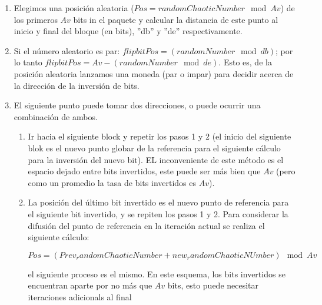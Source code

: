 \begin{enumerate}
\item Elegimos una posición aleatoria ($Pos = randomChaoticNumber \mod{Av}$) de los primeros $Av$ bits in el paquete y calcular la distancia de este punto al inicio y final del bloque (en bits), ''db'' y ''de'' respectivamente.

\item Si el número aleatorio es par: $flipbitPos = (randomNumber \mod{db})$; por lo tanto $flipbitPos = Av - (randomNumber \mod{de})$. Esto es, de la posición aleatoria lanzamos una moneda (par o impar) para decidir acerca de la dirección de la inversión de bits.


\item El siguiente punto puede tomar dos direcciones, o puede ocurrir una combinación de ambos.

\begin{enumerate}
\item Ir hacia el siguiente block y repetir los pasos 1 y 2 (el inicio del siguiente blok es el nuevo punto globar de la referencia para el siguiente cálculo para la inversión del nuevo bit). EL inconveniente de este método es el espacio dejado entre bits invertidos, este puede ser más bien que $Av$ (pero como un promedio la tasa de bits invertidos es $Av$).




\item La posición del último bit invertido es el nuevo punto de referencia para el siguiente bit invertido, y se repiten los pasos 1 y 2. Para considerar la difusión del punto de referencia en la iteración actual se realiza el siguiente cálculo:

\begin{equation}
Pos = (Prev_randomChaoticNumber+new_randomChaoticNUmber) \mod{Av}
\end{equation}

el siguiente proceso es el mismo. En este esquema, los bits invertidos se encuentran aparte por no más que $Av$ bits, esto puede necesitar iteraciones adicionals al final 
\end{enumerate}
\end{enumerate}



